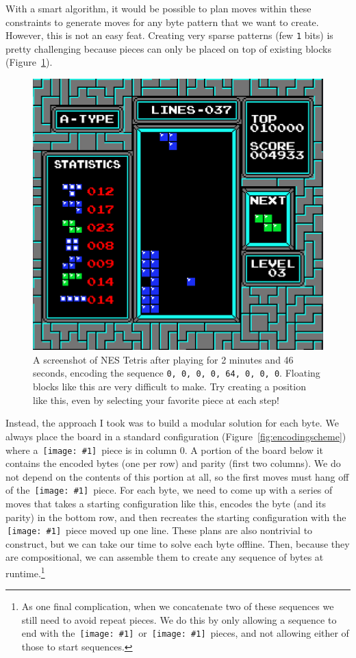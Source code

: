 \documentclass[twocolumn]{article}
\newcommand\tetrispiece[1]{\,\texttt{[image: \#1]}\hspace{0.1em}}
\newcommand\ihoriz{\tetrispiece{i_horiz}}
\newcommand\shoriz{\tetrispiece{s_horiz}}
\newcommand\svert{\tetrispiece{s_vert}}
\begin{document}
With a smart algorithm, it would be possible to plan moves within
these constraints to generate moves for any byte pattern that we want
to create. However, this is not an easy feat. Creating very sparse
patterns (few {\tt 1} bits) is pretty challenging because pieces can
only be placed on top of existing blocks (Figure~\ref{fig:tetrisdot}).

\begin{figure}
  \centering
  \includegraphics[width=\linewidth]{tetrisdot}
  \caption{
    A screenshot of NES Tetris after playing for 2 minutes and 46
    seconds, encoding the sequence {\tt 0, 0, 0, 0, 64, 0, 0, 0}.
    Floating blocks like this are very difficult to make. Try
    creating a position like this, even by selecting your favorite
    piece at each step!
  } \label{fig:tetrisdot}
\end{figure}

Instead, the approach I took was to build a modular solution for each
byte. We always place the board in a standard configuration
(Figure~\ref{fig:encodingscheme}) where a \svert\ piece is in column
0. A portion of the board below it contains the encoded bytes (one per
row) and parity (first two columns). We do not depend on the contents
of this portion at all, so the first moves must hang off of the
\svert\ piece. For each byte, we need to come up with a series of
moves that takes a starting configuration like this, encodes the byte
(and its parity) in the bottom row, and then recreates the starting
configuration with the \svert\ piece moved up one line. These plans
are also nontrivial to construct, but we can take our time to solve
each byte offline. Then, because they are compositional, we can assemble
them to create any sequence of bytes at runtime.\footnote{
  As one final complication, when we concatenate two of these sequences
  we still need to avoid repeat pieces. We do this by only allowing a
  sequence to end with the \shoriz\ or \ihoriz\ pieces, and not
  allowing either of those to start sequences.}
\end{document}
